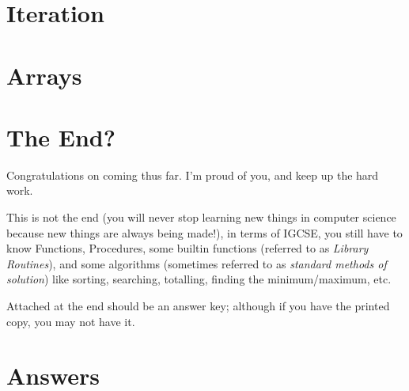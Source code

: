 \documentclass[a4paper, 11pt]{article}
\begin{document}
\newpage 
\section{Iteration}


\newpage
\section{Arrays}


\section{The End?}

Congratulations on coming thus far. I'm proud of you, and keep up the hard work.

This is not the end (you will never stop learning new things in computer science because new things are always being made!), in terms of IGCSE, you still have to know Functions, Procedures, some builtin functions (referred to as \emph{Library Routines}), and some algorithms (sometimes referred to as \emph{standard methods of solution}) like sorting, searching, totalling, finding the minimum/maximum, etc.

Attached at the end should be an answer key; although if you have the printed copy, you may not have it.

\newpage
\section{Answers}

\end{document}
